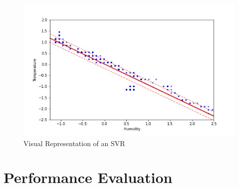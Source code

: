 \documentclass{mpaper}
\begin{document}
\setcounter{figure}{0} 
\setcounter{table}{0}

\begin{figure}[h]
\centering
\includegraphics[scale=0.4]{SVR_representation.jpg}
\caption{\label{fig-SVRex}Visual Representation of an SVR}
\end{figure}



\section{Performance Evaluation}\label{apx:performance_evaluation}
\setcounter{figure}{0} 
\setcounter{table}{0}
\end{document}
